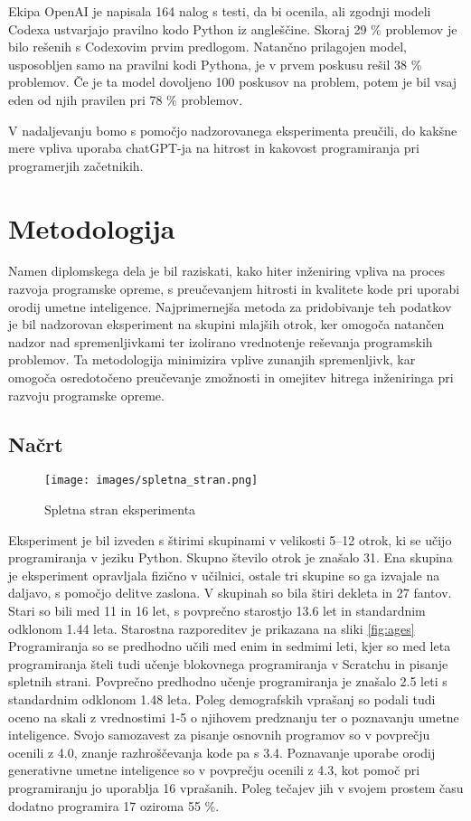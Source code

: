 \documentclass[a4paper,12pt,openright]{book}
\begin{document}
Ekipa OpenAI je napisala 164 nalog s testi, da bi ocenila, ali
zgodnji modeli Codexa ustvarjajo pravilno kodo Python iz angleščine. Skoraj 29 \% problemov je bilo rešenih s Codexovim prvim predlogom. 
Natančno prilagojen model, usposobljen samo na pravilni kodi Pythona,
je v prvem poskusu rešil 38 \% problemov. Če je ta model
dovoljeno 100 poskusov na problem, potem je bil vsaj eden od njih
pravilen pri 78 \% problemov.

\cite{DBLP:journals/corr/abs-2107-03374}

V nadaljevanju bomo s pomočjo nadzorovanega eksperimenta preučili, do kakšne mere vpliva uporaba chatGPT-ja na hitrost in kakovost programiranja pri programerjih začetnikih.


\chapter{Metodologija}
Namen diplomskega dela je bil raziskati, kako hiter inženiring vpliva na proces razvoja programske opreme, s preučevanjem hitrosti in kvalitete kode pri uporabi orodij umetne inteligence. Najprimernejša metoda za pridobivanje teh podatkov je bil nadzorovan eksperiment na skupini mlajših otrok, ker omogoča natančen nadzor nad spremenljivkami ter izolirano vrednotenje reševanja programskih problemov. Ta metodologija minimizira vplive zunanjih spremenljivk, kar omogoča osredotočeno preučevanje zmožnosti in omejitev hitrega inženiringa pri razvoju programske opreme.

\section{Načrt}

\begin{figure}[H]
    \centering
    \texttt{[image: images/spletna\_stran.png]}
    \caption{Spletna stran eksperimenta}
    \label{fig:enter-label}
\end{figure}

Eksperiment je bil izveden s štirimi skupinami v velikosti 5–12 otrok, ki se učijo programiranja v jeziku Python. Skupno število otrok je znašalo 31. Ena skupina je eksperiment opravljala fizično v učilnici, ostale tri skupine so ga izvajale na daljavo, s pomočjo delitve zaslona. V skupinah so bila štiri dekleta in 27 fantov. Stari so bili med 11 in 16 let, s povprečno starostjo 13.6 let in standardnim odklonom 1.44 leta. Starostna razporeditev je prikazana na sliki \ref{fig:ages}  Programiranja so se predhodno učili med enim in sedmimi leti, kjer so med leta programiranja šteli tudi učenje blokovnega programiranja v Scratchu in pisanje spletnih strani. Povprečno predhodno učenje programiranja je znašalo 2.5 leti s standardnim odklonom 1.48 leta.
Poleg demografskih vprašanj so podali tudi oceno na skali z vrednostimi 1-5 o njihovem predznanju ter o poznavanju umetne inteligence. Svojo samozavest za pisanje osnovnih programov so v povprečju ocenili z 4.0, znanje razhroščevanja kode pa s 3.4. Poznavanje uporabe orodij generativne umetne inteligence so v povprečju ocenili z 4.3, kot pomoč pri programiranju jo uporablja 16 vprašanih.
Poleg tečajev jih v svojem prostem času dodatno programira 17 oziroma 55 \%.
\end{document}
